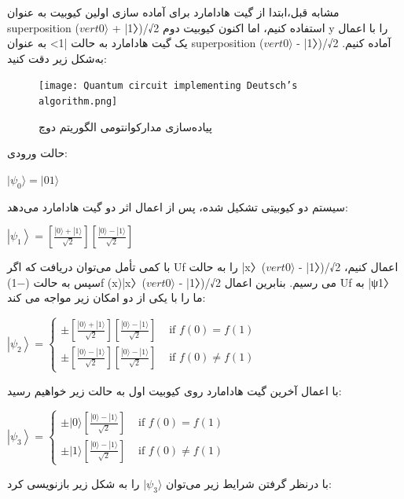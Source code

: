 \documentclass{book}
\begin{document}
مشابه قبل،‌ابتدا از گیت هادامارد برای آماده سازی اولین کیوبیت به عنوان superposition ($vert 0 \rangle$ + |1〉)/√2 استفاده کنیم، اما اکنون کیوبیت دوم y را با اعمال یک گیت هادامارد به حالت |1> به عنوان superposition ($vert 0 \rangle$ - |1〉)/√2 آماده کنیم. به‌شکل زیر دقت کنید:



\begin{figure}[ht]
	\centering
	\texttt{[image: Quantum circuit implementing Deutsch’s algorithm.png]}
	\caption{پیاده‌سازی مدارکوانتومی‌ الگوریتم دوچ}
\end{figure}

\newpage

حالت ورودی:\\
\begin{center}
	$\vert\psi_{0}\rangle = \vert01\rangle$
\end{center}

سیستم دو کیوبیتی تشکیل شده،‌ پس از اعمال اثر دو گیت هادامارد می‌دهد:\\

\begin{center}
$\left|\psi_1\right\rangle=\left[\frac{|0\rangle+|1\rangle}{\sqrt{2}}\right]\left[\frac{|0\rangle-|1\rangle}{\sqrt{2}}\right]$
\end{center}
با کمی تأمل می‌توان دریافت که اگر Uf را به حالت |x〉($vert 0 \rangle$ - |1〉)/√2 اعمال کنیم، سپس به حالت (−1)f (x)|x〉($vert 0 \rangle$ - |1〉)/√2 می رسیم. بنابرین اعمال Uf به |ψ1〉 ما را با یکی از دو امکان زیر مواجه می کند:
\begin{center}
	$\left|\psi_2\right\rangle= \begin{cases} \pm\left[\frac{|0\rangle+|1\rangle}{\sqrt{2}}\right]\left[\frac{|0\rangle-|1\rangle}{\sqrt{2}}\right] & \text { if } f(0)=f(1) \\ \pm\left[\frac{|0\rangle-|1\rangle}{\sqrt{2}}\right]\left[\frac{|0\rangle-|1\rangle}{\sqrt{2}}\right] & \text { if } f(0) \neq f(1) \end{cases}$
\end{center}
با اعمال آخرین گیت هادامارد روی کیوبیت اول به حالت زیر خواهیم رسید:
\begin{center}
	$\left|\psi_3\right\rangle= \begin{cases} \pm|0\rangle\left[\frac{|0\rangle-|1\rangle}{\sqrt{2}}\right] & \text { if } f(0)=f(1) \\ \pm|1\rangle\left[\frac{|0\rangle-|1\rangle}{\sqrt{2}}\right] & \text { if } f(0) \neq f(1) \end{cases}$
\end{center}
با درنظر گرفتن شرایط زیر می‌توان $\vert\psi_{3}\rangle$ را به شکل زیر بازنویسی کرد:
\end{document}
